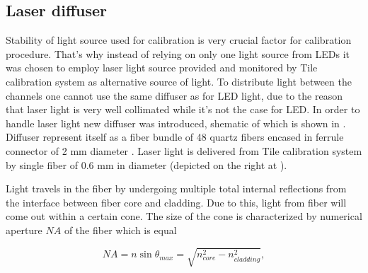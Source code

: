 \subsection{Laser diffuser}
\label{subsec:laserDiffuser}


Stability of light source used for calibration is very crucial factor for calibration procedure.
That's why instead of relying on only one light source from LEDs it was chosen to employ laser light source 
provided and monitored by Tile calibration system \cite{atlasGeneral} as alternative source of light. 
To distribute light between the channels one cannot use the same diffuser as for LED light, 
due to the reason that laser light is very well collimated while it's not the case for LED.
In order to handle laser light new diffuser was introduced, shematic of which is shown in .
Diffuser represent itself as a fiber bundle of 48 quartz fibers encased in ferrule connector of 2 mm diameter .
Laser light is delivered from Tile calibration system by single fiber of 0.6 mm in diameter (depicted on the right at ).

Light travels in the fiber by undergoing multiple total internal reflections from the interface between fiber core and cladding. 
Due to this, light from fiber will come out within a certain cone. The size of the cone is characterized by numerical aperture $NA$ of the fiber which is equal

\begin{equation}
\label{eq:numericalApperture}
 NA = n \sin{\theta_{max}} = \sqrt{n_{core}^2 - n_{cladding}^2},
\end{equation}

